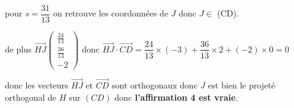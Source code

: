 \documentclass[10pt]{article}
\begin{document}
pour $s=\dfrac{31}{13}$ on retrouve les coordonnées de $J$ donc $J \in$ (CD).

de plus $\overrightarrow{HJ} \begin{pmatrix} \frac{24}{13} \\ \frac{36}{13} \\ -2   \end{pmatrix}$ donc  $\overrightarrow{HJ} \cdot \overrightarrow{CD} = \dfrac{24}{13} \times (-3) + \dfrac{36}{13} \times 2 + (-2) \times 0 = 0$

donc les vecteurs $\overrightarrow{HJ}$ et $\overrightarrow{CD}$ sont orthogonaux donc  \( J \) est bien le projeté orthogonal de \( H \) sur \( (CD) \) donc \textbf{l'affirmation 4 est vraie}.

\bigskip
\end{document}

